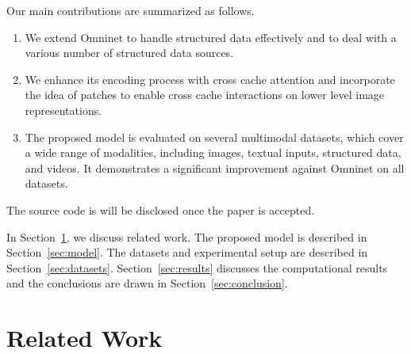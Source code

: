 \documentclass{article}
\begin{document}
Our main contributions are summarized as follows.

\begin{enumerate}
    \item We extend Omninet to handle structured data effectively and to deal with a various number of structured data sources.
    \item We enhance its encoding process with cross cache attention and incorporate the idea of patches to enable cross cache interactions on lower level image representations. 
    \item The proposed model is evaluated on several multimodal datasets, which cover a wide range of modalities, including images, textual inputs, structured data, and videos. It demonstrates a significant improvement against Omninet on all datasets.
\end{enumerate}

The source code is will be disclosed once the paper is accepted.

In Section~\ref{sec:related}, we discuss related work. The proposed model is described in Section~\ref{sec:model}. The datasets and experimental setup are  described in Section~\ref{sec:datasets}. Section~\ref{sec:results} discusses the computational results and the conclusions are drawn in Section~\ref{sec:conclusion}.


\section{Related Work}\label{sec:related}

   
  
\end{document}
